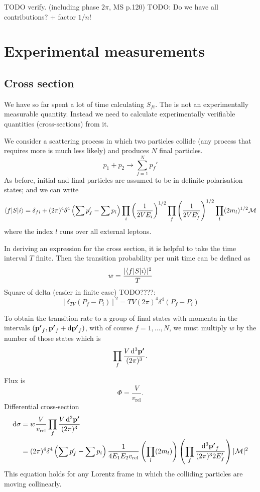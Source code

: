 TODO verify. (including phase $2\pi$, MS p.120)
TODO: Do we have all contributions? + factor $1/n!$

\section{Experimental measurements}
\subsection{Cross section}
We have so far spent a lot of time calculating $S_{fi}$. The is not an experimentally measurable quantity. Instead we need to calculate experimentally verifiable quantities (cross-sections) from it.

We consider a scattering process in which two particles collide (any process that requires more is much less likely) and produces $N$ final particles.
\[ p_1 + p_2 \to \sum^N_{f=1}p_f' \]
As before, initial and final particles are assumed to be in definite polarisation states; and we can write
\[ \braket[S]{f}{i} = \delta_{fi} + (2\pi)^4\delta^4\left(\sum p'_f - \sum p_i\right)\prod_i\left(\frac{1}{2VE_i}\right)^{1/2}\prod_f\left(\frac{1}{2VE'_f}\right)^{1/2}\prod_l(2m_l)^{1/2}\mathcal{M} \]
where the index $l$ runs over all external leptons.

In deriving an expression for the cross section, it is helpful to take the time interval $T$ finite. Then the transition probability per unit time can be defined as
\[ w = \frac{|\braket[S]{f}{i}|^2}{T} \]
Square of delta (easier in finite case) TODO????:
\[ \left[\delta_{TV}(P_f - P_i)\right]^2 = TV(2\pi)^4\delta^4(P_f - P_i) \]

To obtain the transition rate to a group of final states with momenta in the intervals $(\bm{\mathrm{p'}}_f, \bm{\mathrm{p'}}_f + \operatorname{d \!}{\bm{\mathrm{p'}}_f})$, with of course $f = 1,\ldots , N$, we must multiply $w$ by the number of those states which is
\[ \prod_f \frac{V \operatorname{d \!}{^3 \bm{\mathrm{p'}}}}{(2\pi)^3}. \]

Flux is
\[ \Phi = \frac{V}{v_\text{rel}}. \]
Differential cross-section
\begin{align*}
\operatorname{d \!}{\sigma} &= w \frac{V}{v_\text{rel}}\prod_f \frac{V \operatorname{d \!}{^3 \bm{\mathrm{p'}}}}{(2\pi)^3} \\
&= (2\pi)^4 \delta^4\left(\sum p_f' - \sum p_i\right) \frac{1}{4E_1E_2v_\text{rel}}\left(\prod_l(2m_l)\right)\left(\prod_f \frac{\operatorname{d \!}{^3\bm{\mathrm{p'}}_f}}{(2\pi)^3 2E'_f}\right)|\mathcal{M}|^2
\end{align*}
This equation holds for any Lorentz frame in which the colliding particles are moving collinearly.

